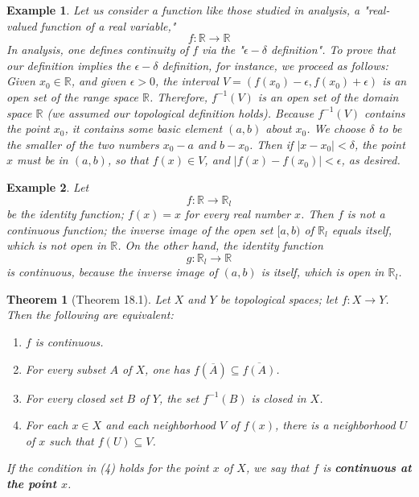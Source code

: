 \documentclass{article}
\newtheorem{theorem}{Theorem}
\newtheorem*{example}{Example}
\theoremstyle{definition}
\theoremstyle{remark}
\begin{document}
    \begin{example}
        Let us consider a function like those studied in analysis, a "real-valued function of a real variable,"
        \[ f: \mathbb{R} \to \mathbb{R} \]
        In analysis, one defines continuity of $f$ via the "$\epsilon-\delta$ definition". To prove that our definition implies
        the $\epsilon-\delta$ definition, for instance, we proceed as follows:\\
        Given $x_0\in\mathbb{R}$, and given $\epsilon>0$, the interval $V = (f(x_0)-\epsilon,f(x_0)+\epsilon)$ is an open set
        of the range space $\mathbb{R}$. Therefore, $f^{-1}(V)$ is an open set of the domain space $\mathbb{R}$ (we assumed our
        topological definition holds). Because $f^{-1}(V)$ contains the point $x_0$, it contains some basic element $(a,b)$ about
        $x_0$. We choose $\delta$ to be the smaller of the two numbers $x_0-a$ and $b-x_0$. Then if $|x-x_0|<\delta$, the point
        $x$ must be in $(a,b)$, so that $f(x)\in V$, and $|f(x) - f(x_0)| < \epsilon$, as desired.
    \end{example}

    \begin{example}
        Let
        \[ f: \mathbb{R} \to \mathbb{R}_l \]
        be the identity function; $f(x) = x$ for every real number $x$. Then $f$ is not a continuous function; the inverse image of
        the open set $[a,b)$ of $\mathbb{R}_l$ equals itself, which is not open in $\mathbb{R}$. On the other hand, the identity
        function
        \[ g: \mathbb{R}_l \to \mathbb{R} \]
        is continuous, because the inverse image of $(a,b)$ is itself, which is open in $\mathbb{R}_l$.
    \end{example}

    \begin{theorem}[Theorem 18.1]
        Let $X$ and $Y$ be topological spaces; let $f: X\to Y$. Then the following are equivalent:
        \begin{enumerate}
            \item $f$ is continuous.
            \item For every subset $A$ of $X$, one has $f(\overline{A})\subseteq \overline{f(A)}$.
            \item For every closed set $B$ of $Y$, the set $f^{-1}(B)$ is closed in $X$.
            \item For each $x\in X$ and each neighborhood $V$ of $f(x)$, there is a neighborhood $U$ of $x$ such that $f(U)\subseteq V$.
        \end{enumerate}
        If the condition in (4) holds for the point $x$ of $X$, we say that $f$ is \textbf{continuous at the point $x$}.
    \end{theorem}
\end{document}
